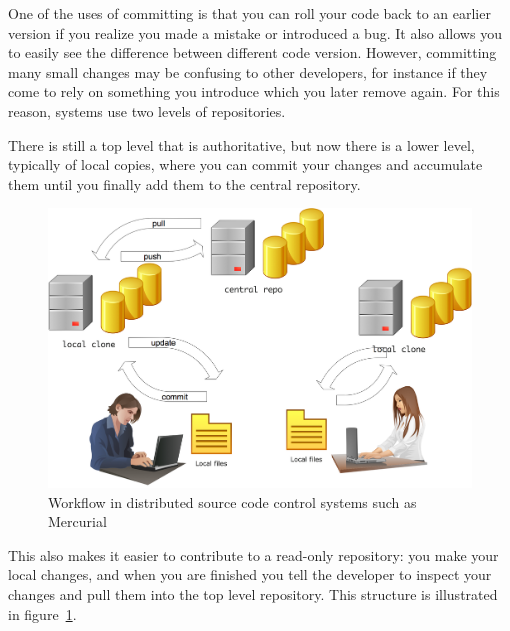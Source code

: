 One of the uses of committing is that you can roll your code back to
an earlier version if you realize you made a mistake or introduced a
bug. It also allows you to easily see the difference between different
code version. However, committing many small changes may be confusing
to other developers, for instance if they come to rely on something
you introduce which you later remove again. For this reason,
 systems use two levels
of repositories.

There is still a top level that is authoritative, but
now there is a lower level, typically of local copies, where you can
commit your changes and accumulate them until you finally add them to
the central repository.
\begin{figure}[ht]
\includegraphics[scale=.19]{graphics/repo-flow-hg}
\caption{Workflow in distributed source code control systems such as Mercurial}
\label{fig:hg}
\end{figure}
This also makes it easier to contribute to a read-only repository:
you make your local changes, and when you are finished you tell the 
developer to inspect your changes and pull them into the top level 
repository. This structure is illustrated in figure~\ref{fig:hg}.

%

